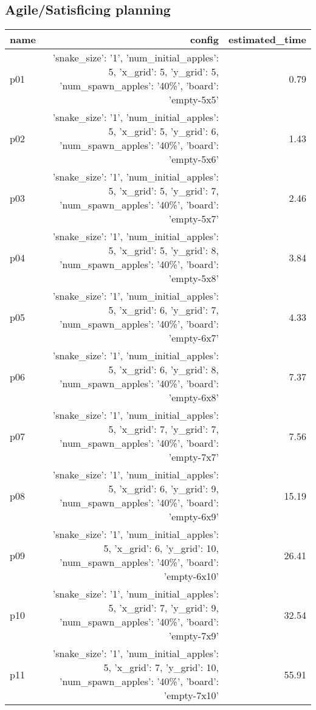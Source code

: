 \documentclass{article}
\begin{document}
                                \subsection*{Agile/Satisficing planning}
                                
                            \begin{center}
                            \scriptsize
                            \begin{tabular}{@{}l|r|r@{}}
                            name & config & estimated\_time\\\midrule
                              p01&{'snake\_size': '1', 'num\_initial\_apples': 5, 'x\_grid': 5, 'y\_grid': 5, 'num\_spawn\_apples': '40\%', 'board': 'empty-5x5'}&0.79\\
  p02&{'snake\_size': '1', 'num\_initial\_apples': 5, 'x\_grid': 5, 'y\_grid': 6, 'num\_spawn\_apples': '40\%', 'board': 'empty-5x6'}&1.43\\
  p03&{'snake\_size': '1', 'num\_initial\_apples': 5, 'x\_grid': 5, 'y\_grid': 7, 'num\_spawn\_apples': '40\%', 'board': 'empty-5x7'}&2.46\\
  p04&{'snake\_size': '1', 'num\_initial\_apples': 5, 'x\_grid': 5, 'y\_grid': 8, 'num\_spawn\_apples': '40\%', 'board': 'empty-5x8'}&3.84\\
  p05&{'snake\_size': '1', 'num\_initial\_apples': 5, 'x\_grid': 6, 'y\_grid': 7, 'num\_spawn\_apples': '40\%', 'board': 'empty-6x7'}&4.33\\
  p06&{'snake\_size': '1', 'num\_initial\_apples': 5, 'x\_grid': 6, 'y\_grid': 8, 'num\_spawn\_apples': '40\%', 'board': 'empty-6x8'}&7.37\\
  p07&{'snake\_size': '1', 'num\_initial\_apples': 5, 'x\_grid': 7, 'y\_grid': 7, 'num\_spawn\_apples': '40\%', 'board': 'empty-7x7'}&7.56\\
  p08&{'snake\_size': '1', 'num\_initial\_apples': 5, 'x\_grid': 6, 'y\_grid': 9, 'num\_spawn\_apples': '40\%', 'board': 'empty-6x9'}&15.19\\
  p09&{'snake\_size': '1', 'num\_initial\_apples': 5, 'x\_grid': 6, 'y\_grid': 10, 'num\_spawn\_apples': '40\%', 'board': 'empty-6x10'}&26.41\\
  p10&{'snake\_size': '1', 'num\_initial\_apples': 5, 'x\_grid': 7, 'y\_grid': 9, 'num\_spawn\_apples': '40\%', 'board': 'empty-7x9'}&32.54\\
  p11&{'snake\_size': '1', 'num\_initial\_apples': 5, 'x\_grid': 7, 'y\_grid': 10, 'num\_spawn\_apples': '40\%', 'board': 'empty-7x10'}&55.91\\

\end{tabular}
\end{center}
\end{document}
